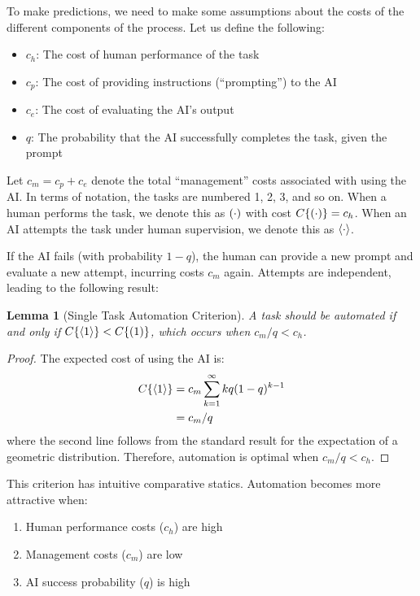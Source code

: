 \documentclass{article}
\newtheorem{lemma}[theorem]{Lemma}
\begin{document}
To make predictions, we need to make some assumptions about the costs of the different components of the process.
Let us define the following:
\begin{itemize}
    \item $c_h$: The cost of human performance of the task
    \item $c_p$: The cost of providing instructions (``prompting'') to the AI
    \item $c_e$: The cost of evaluating the AI's output
    \item $q$: The probability that the AI successfully completes the task, given the prompt
\end{itemize}

Let $c_m = c_p + c_e$ denote the total ``management'' costs associated with using the AI.
In terms of notation, the tasks are numbered 1, 2, 3, and so on.
When a human performs the task, we denote this as $( \cdot )$ with cost $C\{ ( \cdot ) \} = c_h$.
When an AI attempts the task under human supervision, we denote this as $\langle \cdot \rangle$.

If the AI fails (with probability $1-q$), the human can provide a new prompt and evaluate a new attempt, incurring costs $c_m$ again.
Attempts are independent, leading to the following result:

\begin{lemma}[Single Task Automation Criterion] \label{lemma:single}
A task should be automated if and only if $C\{ \langle 1 \rangle \} < C\{ ( 1 ) \}$, which occurs when $c_m/q < c_h$.
\end{lemma}
\begin{proof}
The expected cost of using the AI is:
\begin{align*}
    C\{ \langle 1 \rangle \} &= c_m \sum_{k=1}^{\infty} k q(1-q)^{k-1} \\
    &= c_m/q
\end{align*}
where the second line follows from the standard result for the expectation of a geometric distribution.
Therefore, automation is optimal when $c_m/q < c_h$.
\end{proof}

This criterion has intuitive comparative statics.
Automation becomes more attractive when:
\begin{enumerate}
    \item Human performance costs ($c_h$) are high
    \item Management costs ($c_m$) are low
    \item AI success probability ($q$) is high
\end{enumerate}
\end{document}
